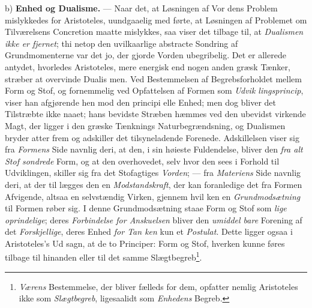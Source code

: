 %

b) \textbf{Enhed og Dualisme.} --- Naar det, at Løsningen af Vor\-%
dens Problem mislykkedes for Aristoteles, uundgaaelig med\-%
førte, at Løsningen af Problemet om Tilværelsens Concretion
 \setcounter{footnote}{0}
maatte mislykkes, saa viser det tilbage til, at \emph{Dualismen
ikke er fjernet}; thi netop den uvilkaarlige abstracte Sondring
af Grundmomenterne var det jo, der gjorde Vorden ubegribelig.
Det er allerede antydet, hvorledes Aristoteles, mere energisk
end nogen anden græsk Tænker, stræber at overvinde Dualis\-%
men. Ved Bestemmelsen af Begrebsforholdet mellem Form og
Stof, og fornemmelig ved Opfattelsen af Formen som \emph{Udvik\-%
lingsprincip}, viser han afgjørende hen mod den principi\-%
elle Enhed; men dog bliver det Tilstræbte ikke naaet; hans
bevidste Stræben hæmmes ved den ubevidst virkende Magt,
der ligger i den græske Tænknings Naturbegrændsning, og
Dualismen bryder atter frem og adskiller det tilsyneladende
Forenede. Adskillelsen viser sig fra \emph{Formens} Side navnlig
deri, at den, i sin høieste Fuldendelse, bliver den \emph{fra alt
Stof sondrede} Form, og at den overhovedet, selv hvor den
sees i Forhold til Udviklingen, skiller sig fra det Stofagtiges
\emph{Vorden}; --- fra \emph{Materiens} Side navnlig deri, at der til\-%
lægges den en \emph{Modstandskraft}, der kan foranledige det fra
Formen Afvigende, altsaa en selvstændig Virken, gjennem hvil\-%
ken en \emph{Grundmodsætning} til Formen røber sig. I denne
Grundmodsætning staae Form og Stof som \emph{lige oprindelige};
deres \emph{Forbindelse for Anskuelsen} bliver den \emph{umiddel\-%
bare} Forening af det \emph{Forskjellige}, deres Enhed \emph{for Tan\-%
ken} kun et \emph{Postulat}. Dette ligger ogsaa i Aristoteles's Ud\-%
sagn, at de to Principer: Form og Stof, hverken kunne føres
tilbage til hinanden eller til det samme Slægtbegreb\footnote{\emph{Værens}
Bestemmelse, der bliver fælleds for dem, opfatter nemlig
Aristoteles ikke som \emph{Slægtbegreb}, ligesaalidt som \emph{Enhedens}
Begreb.}.

